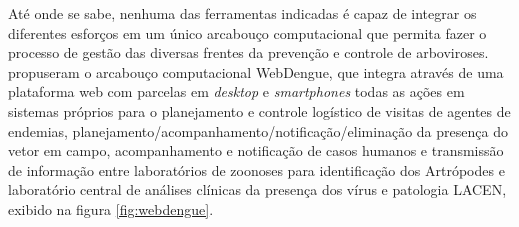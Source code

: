 Até onde se sabe, nenhuma das ferramentas indicadas é capaz de integrar os diferentes esforços em um único arcabouço computacional que permita fazer o processo de gestão das diversas frentes da prevenção e controle de arboviroses.  propuseram o arcabouço computacional WebDengue, que integra através de uma plataforma web com parcelas em \emph{desktop} e \emph{smartphones} todas as ações em sistemas próprios para o planejamento e controle logístico de visitas de agentes de endemias, planejamento/acompanhamento/notificação/eliminação da presença do vetor em campo, acompanhamento e notificação de casos humanos e transmissão de informação entre laboratórios de zoonoses para identificação dos Artrópodes e laboratório central de análises clínicas da presença dos vírus e patologia \acrshort{LACEN}, exibido na figura \ref{fig:webdengue}.


\begin{figure}[!ht]
	\centering
\end{figure}


